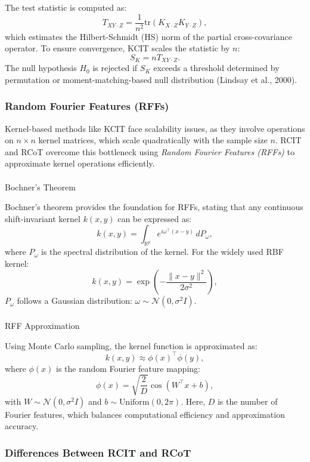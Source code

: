 \documentclass[
]{article}
\makeatletter
\let\oldparagraph\paragraph
\renewcommand{\paragraph}{
    \@ifstar
      \xxxParagraphStar
      \xxxParagraphNoStar
  }
\newcommand{\xxxParagraphStar}[1]{\oldparagraph*{#1}\mbox{}}
\newcommand{\xxxParagraphNoStar}[1]{\oldparagraph{#1}\mbox{}}
\makeatother
\begin{document}
The test statistic is computed as: \[
T_{XY \cdot Z} = \frac{1}{n^2} \text{tr}(K_{X \cdot Z} K_{Y \cdot Z}),
\] which estimates the Hilbert-Schmidt (HS) norm of the partial
cross-covariance operator. To ensure convergence, KCIT scales the
statistic by \(n\): \[
S_K = n T_{XY \cdot Z}.
\] The null hypothesis \(H_0\) is rejected if \(S_K\) exceeds a
threshold determined by permutation or moment-matching-based null
distribution (Lindsay et al., 2000).

\subsubsection{Random Fourier Features
(RFFs)}\label{random-fourier-features-rffs}

Kernel-based methods like KCIT face scalability issues, as they involve
operations on \(n \times n\) kernel matrices, which scale quadratically
with the sample size \(n\). RCIT and RCoT overcome this bottleneck using
\emph{Random Fourier Features (RFFs)} to approximate kernel operations
efficiently.

\paragraph{Bochner's Theorem}\label{bochners-theorem}

Bochner's theorem provides the foundation for RFFs, stating that any
continuous shift-invariant kernel \(k(x, y)\) can be expressed as: \[
k(x, y) = \int_{\mathbb{R}^p} e^{i \omega^\top (x - y)} \, dP_\omega,
\] where \(P_\omega\) is the spectral distribution of the kernel. For
the widely used RBF kernel: \[
k(x, y) = \exp\left(-\frac{\|x - y\|^2}{2\sigma^2}\right),
\] \(P_\omega\) follows a Gaussian distribution:
\(\omega \sim \mathcal{N}(0, \sigma^2 I)\).

\paragraph{RFF Approximation}\label{rff-approximation}

Using Monte Carlo sampling, the kernel function is approximated as: \[
k(x, y) \approx \phi(x)^\top \phi(y),
\] where \(\phi(x)\) is the random Fourier feature mapping: \[
\phi(x) = \sqrt{\frac{2}{D}} \cos(W^\top x + b),
\] with \(W \sim \mathcal{N}(0, \sigma^2 I)\) and
\(b \sim \text{Uniform}(0, 2\pi)\). Here, \(D\) is the number of Fourier
features, which balances computational efficiency and approximation
accuracy.

\subsubsection{Differences Between RCIT and
RCoT}\label{differences-between-rcit-and-rcot}
\end{document}
